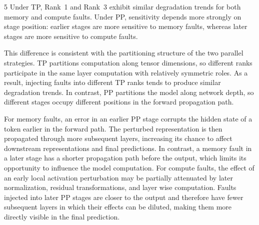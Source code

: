 \begin{observationbox}{5}
Under TP, Rank~1 and Rank~3 exhibit similar degradation trends for both
memory and compute faults. Under PP, sensitivity depends more strongly on
stage position: earlier stages are more sensitive to memory faults, whereas
later stages are more sensitive to compute faults.
\end{observationbox}

This difference is consistent with the partitioning structure of the two parallel strategies. TP partitions computation along tensor dimensions, so different ranks participate in the same layer computation with relatively symmetric roles. As a result, injecting faults into different TP ranks tends to produce similar degradation trends. In contrast, PP partitions the model along network depth, so different stages occupy different positions in the forward propagation path.

For memory faults, an error in an earlier PP stage corrupts the hidden state of a token earlier in the forward path. The perturbed representation is then propagated through more subsequent layers, increasing its chance to affect downstream representations and final predictions. In contrast, a memory fault in a later stage has a shorter propagation path before the output, which limits its opportunity to influence the model computation. For compute faults, the effect of an early local activation perturbation may be partially attenuated by later normalization, residual transformations, and layer wise computation. Faults injected into later PP stages are closer to the output and therefore have fewer subsequent layers in which their effects can be diluted, making them more directly visible in the final prediction.
